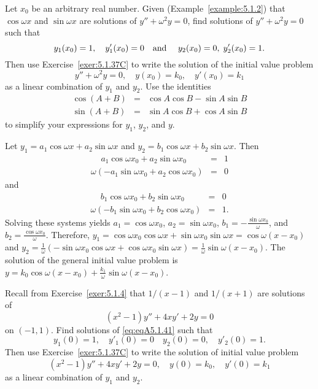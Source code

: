 \documentclass{ximera}
\begin{document}
\begin{problem}\label{exer:5.1.40}
Let $x_0$ be an arbitrary real number. Given (Example~\ref{example:5.1.2})
that $\cos\omega x$ and $\sin\omega x$ are solutions of
$y''+\omega^2y=0$, find solutions of
 $y''+\omega^2y=0$ such that
$$
y_1(x_0)=1, \quad y'_1(x_0)=0\mbox{\quad  and  \quad}
y_2(x_0)=0,\;  y'_2(x_0)=1.
$$
Then use Exercise~\ref{exer:5.1.37C} to write
the solution of the initial value problem
$$
y''+\omega^2y=0,\quad y(x_0)=k_0,\quad y'(x_0)=k_1
$$
as a linear combination of $y_1$ and $y_2$.
Use the identities
\begin{eqnarray*}
\cos(A+B)&=&\cos A\cos B-\sin A\sin B\\
\sin(A+B)&=&\sin A\cos B+\cos A\sin B
\end{eqnarray*}
to  simplify your expressions for $y_1$, $y_2$, and $y$.

\begin{solution}
    Let $y_1=a_1\cos\omega x+a_2\sin\omega x$ and
 $y_2=b_1\cos\omega x+b_2\sin\omega x$. Then
\begin{eqnarray*}
\phantom{(-}a_1\cos\omega x_0+a_2\sin\omega x_0\phantom{)}&=&1\\
\omega(-a_1\sin\omega x_0+a_2\cos\omega x_0)&=&0
\end{eqnarray*}
and
\begin{eqnarray*}
\phantom{(-}b_1\cos\omega x_0+b_2\sin\omega x_0\phantom{)}&=&0\\
\omega(-b_1\sin\omega x_0+b_2\cos\omega x_0)&=&1.
\end{eqnarray*}
Solving these systems yields $a_1=\cos\omega x_0$,
$a_2=\sin\omega x_0$, $b_1=-\frac{\sin\omega x_0}{\omega}$, and
$b_2=\frac{\cos\omega x_0}{\omega}$. Therefore,
$y_1=\cos\omega x_0\cos\omega x+\sin\omega x_0\sin\omega
x=\cos\omega(x-x_0)$ and
 $y_2=\frac{1}{\omega}(-\sin\omega x_0\cos\omega x+\cos\omega x_0
\sin\omega x)=\frac{1}{\omega}\sin\omega(x-x_0)$.
 The solution of the general
initial value problem is
$y=k_0\cos\omega(x-x_0)+\frac{k_1}{\omega}\sin\omega(x-x_0)$.
\end{solution}
\end{problem}

\begin{problem}\label{exer:5.1.41}
Recall from Exercise~\ref{exer:5.1.4} that
 $1/(x-1)$ and $1/(x+1)$ are solutions of
\begin{equation}\label{eq:eqA5.1.41}
(x^2-1)y''+4xy'+2y=0
\end{equation}
on $(-1,1)$.
Find solutions of \ref{eq:eqA5.1.41}
 such that
$$
y_1(0)=1, \quad y'_1(0)=0\quad  
y_2(0)=0,\quad  y'_2(0)=1.
$$
Then use  Exercise~\ref{exer:5.1.37C} to write
the solution of  initial value problem
$$
(x^2-1)y''+4xy'+2y=0,\quad  y(0)=k_0,\quad y'(0)=k_1
$$
as a linear combination of $y_1$ and $y_2$.
\end{problem}
\end{document}
